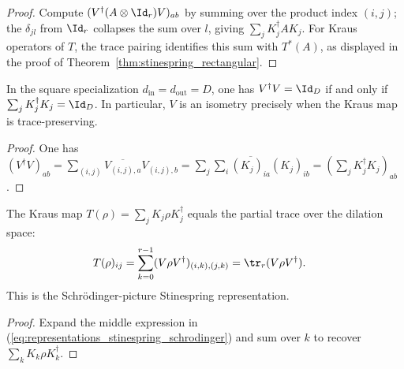 \begin{proof}
    \leanok
    Compute $(V^\dagger(A\otimes\Id_r)V)_{ab}$
    by summing over the product index $(i,j)$;
    the $\delta_{jl}$ from $\Id_r$ collapses the sum over $l$, giving
    $\sum_j K_j^\dagger A K_j$. For Kraus operators of $T$, the trace
    pairing identifies this sum with $T^*(A)$, as displayed in the proof of
    Theorem~\ref{thm:stinespring_rectangular}.
\end{proof}

\begin{theorem}\label{thm:stinespringV_isometry_iff_kraus_normalized}
    \leanok
    In the square specialization
    $d_{\mathrm{in}}=d_{\mathrm{out}}=D$, one has
    $V^\dagger V=\Id_D$ if and only if
    $\sum_j K_j^\dagger K_j=\Id_D$.
    In particular, $V$ is an isometry precisely when the Kraus map is
    trace-preserving.
\end{theorem}

\begin{proof}
    \leanok
    One has
    $(V^\dagger V)_{ab}
    =\sum_{(i,j)}\overline{V_{(i,j),a}}V_{(i,j),b}
    =\sum_j\sum_i\overline{(K_j)_{ia}}(K_j)_{ib}
    =(\sum_jK_j^\dagger K_j)_{ab}$.
\end{proof}

\begin{theorem}\label{thm:stinespring_schrodinger_representation}
    \leanok
    The Kraus map $T(\rho)=\sum_jK_j\rho K_j^\dagger$ equals
    the partial trace over the dilation space:
    \begin{align}
        T(\rho)_{ij}
        &=\sum_{k=0}^{r-1}(V\rho V^\dagger)_{(i,k),(j,k)}
          =\tr_r(V\rho V^\dagger).
        \label{eq:representations_stinespring_schrodinger}
    \end{align}
    This is the Schr\"odinger-picture Stinespring representation.
\end{theorem}

\begin{proof}
    \leanok
    Expand the middle expression in
    (\ref{eq:representations_stinespring_schrodinger}) and sum over $k$ to
    recover $\sum_kK_k\rho K_k^\dagger$.
\end{proof}

